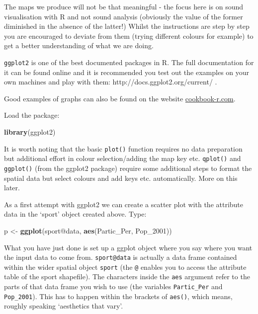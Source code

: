 \documentclass[]{article}
\newenvironment{Shaded}{}{}
\newcommand{\KeywordTok}[1]{\textcolor[rgb]{0.00,0.44,0.13}{\textbf{{#1}}}}
\newcommand{\NormalTok}[1]{{#1}}
\begin{document}
The maps we produce will not be that meaningful - the focus here is on
sound visualisation with R and not sound analysis (obviously the value
of the former diminished in the absence of the latter!) Whilst the
instructions are step by step you are encouraged to deviate from them
(trying different colours for example) to get a better understanding of
what we are doing.

\texttt{ggplot2} is one of the best documented packages in R. The full
documentation for it can be found online and it is recommended you test
out the examples on your own machines and play with them:
http://docs.ggplot2.org/current/ .

Good examples of graphs can also be found on the website
\href{http://www.cookbook-r.com/Graphs/}{cookbook-r.com}.

Load the package:

\begin{Shaded}
\begin{Highlighting}[]
\KeywordTok{library}\NormalTok{(ggplot2)}
\end{Highlighting}
\end{Shaded}
It is worth noting that the basic \texttt{plot()} function requires no
data preparation but additional effort in colour selection/adding the
map key etc. \texttt{qplot()} and \texttt{ggplot()} (from the ggplot2
package) require some additional steps to format the spatial data but
select colours and add keys etc. automatically. More on this later.

As a first attempt with ggplot2 we can create a scatter plot with the
attribute data in the `sport' object created above. Type:

\begin{Shaded}
\begin{Highlighting}[]
\NormalTok{p <- }\KeywordTok{ggplot}\NormalTok{(sport@data, }\KeywordTok{aes}\NormalTok{(Partic_Per, Pop_2001))}
\end{Highlighting}
\end{Shaded}
What you have just done is set up a ggplot object where you say where
you want the input data to come from. \texttt{sport@data} is actually a
data frame contained within the wider spatial object \texttt{sport} (the
\texttt{@} enables you to access the attribute table of the sport
shapefile). The characters inside the \texttt{aes} argument refer to the
parts of that data frame you wish to use (the variables
\texttt{Partic\_Per} and \texttt{Pop\_2001}). This has to happen within
the brackets of \texttt{aes()}, which means, roughly speaking
`aesthetics that vary'.
\end{document}
